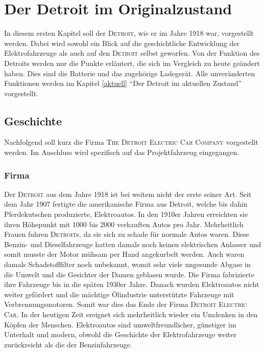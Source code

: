 \chapter{Der Detroit im Originalzustand}
In diesem ersten Kapitel soll der \textsc{Detroit}, wie er im Jahre 1918 war, vorgestellt werden. Dabei wird sowohl ein Blick auf die geschichtliche Entwicklung der Elektrofahrzeuge als auch auf den \textsc{Detroit} selbst geworfen. Von der Funktion des Detroits werden nur die Punkte erläutert, die sich im Vergleich zu heute geändert haben. Dies sind die Batterie und das zugehörige Ladegerät. Alle unveränderten Funktionen werden im Kapitel \ref{aktuell} "`Der Detroit im aktuellen Zustand"' vorgestellt.

\section{Geschichte}

Nachfolgend soll kurz die Firma \textsc{The Detroit Electric Car Company} vorgestellt werden. Im Anschluss wird spezifisch auf das Projektfahrzeug eingegangen.

\subsection{Firma}

Der \textsc{Detroit} aus dem Jahre 1918 ist bei weitem nicht der erste seiner Art. Seit dem Jahr 1907 fertigte die amerikanische Firma aus Detroit, welche bis dahin Pferdekutschen produzierte, Elektroautos. In den 1910er Jahren erreichten sie ihren Höhepunkt mit 1000 bis 2000 verkauften Autos pro Jahr. Mehrheitlich Frauen fuhren \textsc{Detroit}s, da sie sich zu schade für normale Autos waren. Diese Benzin- und Dieselfahrzeuge hatten damals noch keinen elektrischen Anlasser und somit musste der Motor mühsam per Hand angekurbelt werden. Auch waren damals Schadstofffilter noch unbekannt, womit sehr viele ungesunde Abgase in die Umwelt und die Gesichter der Damen geblasen wurde. Die Firma fabrizierte ihre Fahrzeuge bis in die späten 1930er Jahre. Danach wurden Elektroautos nicht weiter gefördert und die mächtige Ölindustrie unterstützte Fahrzeuge mit Verbrennungsmotoren. Somit war dies das Ende der Firma \textsc{Detroit Electric Car}.
In der heutigen Zeit ereignet sich mehrheitlich wieder ein Umdenken in den Köpfen der Menschen. Elektroautos sind umweltfreundlicher, günstiger im Unterhalt und modern, obwohl die Geschichte der Elektrofahrzeuge weiter zurückreicht als die der Benzinfahrzeuge.

